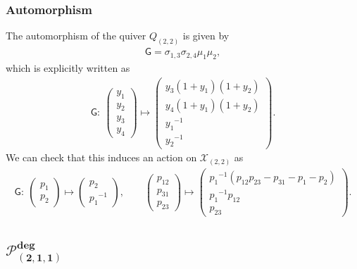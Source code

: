 \documentclass[10pt,a4paper]{amsart}
\numberwithin{equation}{section}
\begin{document}
\subsubsection*{Automorphism}
The automorphism of the quiver $Q_{(2,2)}$ is given by
\begin{gather} \label{G_22}
 \mathsf{G} = \sigma_{1,3} \sigma_{2,4} \mu_1 \mu_2 ,
\end{gather}
which is explicitly written as
\begin{gather*}
 \mathsf{G}\colon \
 \begin{pmatrix}
 y_1 \\ y_2 \\ y_3 \\ y_4
 \end{pmatrix}
 \mapsto
 \begin{pmatrix}
 y_3( 1+y_1 ) (1+y_2 ) \\
 y_4 ( 1+y_1)(1+y_2 ) \\
 {y_1}^{-1} \\
 {y_2}^{-1}
 \end{pmatrix} .
\end{gather*}
We can check that this induces an action on $\mathcal{X}_{(2,2)}$ as
\begin{gather*}
 \mathsf{G}\colon \
 \begin{pmatrix}
 p_1 \\
 p_2
 \end{pmatrix}
 \mapsto
 \begin{pmatrix}
 p_2 \\
 {p_1}^{-1}
 \end{pmatrix},
 \qquad
 \begin{pmatrix}
 p_{12} \\
 p_{31} \\
 p_{23}
 \end{pmatrix}
 \mapsto
 \begin{pmatrix}
 {p_1}^{-1}( p_{12} p_{23} - p_{31} - p_1 - p_2 ) \\
 {p_1}^{-1} p_{12} \\
 p_{23}
 \end{pmatrix} .
\end{gather*}

\subsection[$\mathcal{P}_{(2,1,1)}^{\text{deg}}$]{$\boldsymbol{\mathcal{P}_{(2,1,1)}^{\text{deg}}}$}
\end{document}
